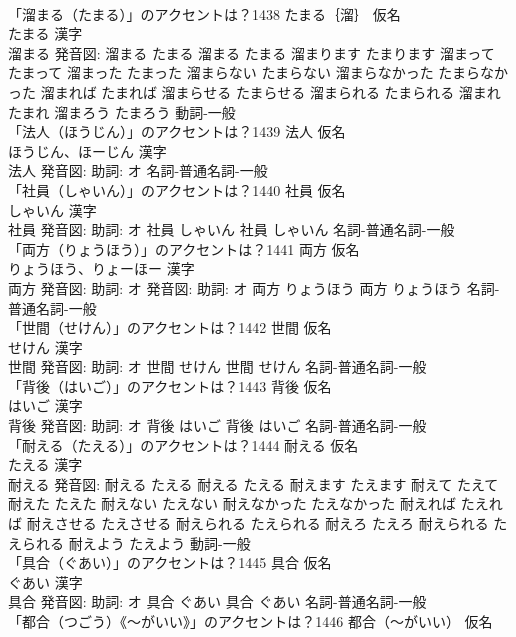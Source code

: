 \documentclass[8pt]{extreport}
\begin{document}
\begin{CJK}{UTF8}{min}
\\	「溜まる（たまる）」のアクセントは？1438	たまる｛溜｝ 仮名　
\\	たまる 漢字　
\\	溜まる 発音図:	溜まる たまる		溜まる たまる 溜まります たまります 溜まって たまって 溜まった たまった 溜まらない たまらない 溜まらなかった たまらなかった 溜まれば たまれば 溜まらせる たまらせる 溜まられる たまられる 溜まれ たまれ 溜まろう たまろう				動詞-一般 
\\	「法人（ほうじん）」のアクセントは？1439	法人 仮名　
\\	ほうじん、ほーじん 漢字　
\\	法人 発音図: 助詞: オ							名詞-普通名詞-一般 
\\	「社員（しゃいん）」のアクセントは？1440	社員 仮名　
\\	しゃいん 漢字　
\\	社員 発音図: 助詞: オ	社員 しゃいん		社員 しゃいん				名詞-普通名詞-一般 
\\	「両方（りょうほう）」のアクセントは？1441	両方 仮名　
\\	りょうほう、りょーほー 漢字　
\\	両方 発音図: 助詞: オ 発音図: 助詞: オ	両方 りょうほう		両方 りょうほう				名詞-普通名詞-一般 
\\	「世間（せけん）」のアクセントは？1442	世間 仮名　
\\	せけん 漢字　
\\	世間 発音図: 助詞: オ	世間 せけん		世間 せけん				名詞-普通名詞-一般 
\\	「背後（はいご）」のアクセントは？1443	背後 仮名　
\\	はいご 漢字　
\\	背後 発音図: 助詞: オ	背後 はいご		背後 はいご				名詞-普通名詞-一般 
\\	「耐える（たえる）」のアクセントは？1444	耐える 仮名　
\\	たえる 漢字　
\\	耐える 発音図:	耐える たえる		耐える たえる 耐えます たえます 耐えて たえて 耐えた たえた 耐えない たえない 耐えなかった たえなかった 耐えれば たえれば 耐えさせる たえさせる 耐えられる たえられる 耐えろ たえろ 耐えられる たえられる 耐えよう たえよう				動詞-一般 
\\	「具合（ぐあい）」のアクセントは？1445	具合 仮名　
\\	ぐあい 漢字　
\\	具合 発音図: 助詞: オ	具合 ぐあい		具合 ぐあい				名詞-普通名詞-一般 
\\	「都合（つごう）《〜がいい》」のアクセントは？1446	都合（〜がいい） 仮名　

\end{CJK}
\end{document}
